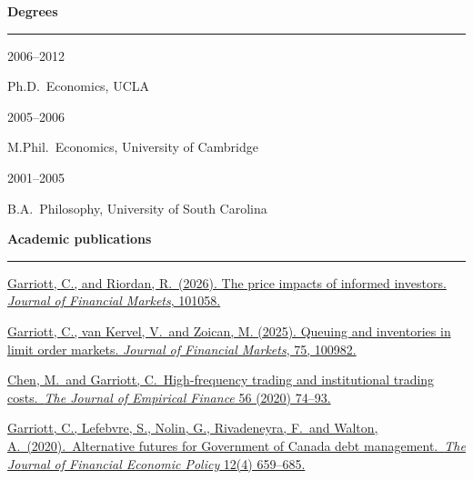 \documentclass[11pt,letterpaper]{article}
\begin{document}
\bigskip
\noindent \textbf{Degrees}
\smallskip
\hrule

\medskip
\noindent
\begin{minipage}[ht]{0.15\textwidth}
2006--2012

\end{minipage}
\begin{minipage}[ht]{0.80\textwidth}
Ph.D.~Economics, UCLA
\end{minipage}

\smallskip
\noindent
\begin{minipage}[ht]{0.15\textwidth}
2005--2006

\end{minipage}
\begin{minipage}[ht]{0.80\textwidth}
M.Phil.~Economics, University of Cambridge
\end{minipage}

\smallskip
\noindent
\begin{minipage}[ht]{0.15\textwidth}
2001--2005

\end{minipage}
\begin{minipage}[ht]{0.80\textwidth}
B.A.~Philosophy, University of South Carolina
\end{minipage}

\bigskip
\noindent \textbf{Academic publications}
\smallskip
\hrule
\medskip

\noindent
\noindent \href{https://papers.ssrn.com/sol3/papers.cfm?abstract_id=4866008}{Garriott, C., and Riordan, R.~(2026). The price impacts of informed investors. \textit{Journal of Financial Markets}, 101058.}

\bigskip
\noindent \href{https://www.sciencedirect.com/science/article/pii/S1386418125000229}{Garriott, C., van Kervel, V.~and Zoican, M. (2025). Queuing and inventories in limit order markets. \textit{Journal of Financial Markets}, 75, 100982.}

\bigskip
\noindent \href{https://www.sciencedirect.com/science/article/pii/S0927539819301069/pdfft?md5=acc9a68e6a64edb6e7f2ecc0f1691498&pid=1-s2.0-S0927539819301069-main.pdf}{Chen, M.~and Garriott, C.~High-frequency trading and institutional trading costs.~\textit{The Journal of Empirical Finance} 56 (2020) 74--93.}

\bigskip
\noindent \href{https://www.bankofcanada.ca/2018/12/staff-discussion-paper-2018-15/}{Garriott, C., Lefebvre, S., Nolin, G., Rivadeneyra, F.~and Walton, A.~(2020).~Alternative futures for Government of Canada debt management.~\textit{The Journal of Financial Economic Policy} 12(4) 659--685.}
\end{document}
